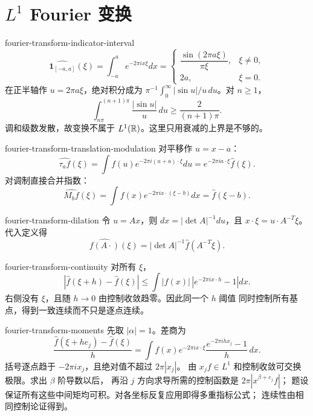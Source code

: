 \chapter{\texorpdfstring{\(L^1\)}{L1} Fourier 变换}

\begin{solution}{fourier-transform-indicator-interval}
\[
 \widehat{\mathbf1_{[-a,a]}}(\xi)
 =\int_{-a}^{a}e^{-2\pi ix\xi}dx
 =\begin{cases}\dfrac{\sin(2\pi a\xi)}{\pi\xi},&\xi\ne0,\\2a,&\xi=0.\end{cases}
\]
在正半轴作 \(u=2\pi a\xi\)，绝对积分成为
\(\pi^{-1}\int_0^\infty|\sin u|/u\,du\)。对 \(n\ge1\)，
\[
 \int_{n\pi}^{(n+1)\pi}\frac{|\sin u|}{u}\,du
 \ge\frac{2}{(n+1)\pi}.
\]
调和级数发散，故变换不属于 \(L^1(\mathbb{R})\)。这里只用衰减的上界是不够的。
\end{solution}

\begin{solution}{fourier-transform-translation-modulation}
对平移作 \(u=x-a\)：
\[
 \widehat{\tau_af}(\xi)=\int f(u)e^{-2\pi i(u+a)\cdot\xi}du
 =e^{-2\pi ia\cdot\xi}\widehat f(\xi).
\]
对调制直接合并指数：
\[
 \widehat{M_bf}(\xi)=\int f(x)e^{-2\pi ix\cdot(\xi-b)}dx
 =\widehat f(\xi-b).
\]
\end{solution}

\begin{solution}{fourier-transform-dilation}
令 \(u=Ax\)，则 \(dx=|\det A|^{-1}du\)，且
\(x\cdot\xi=u\cdot A^{-T}\xi\)。代入定义得
\[
 \widehat{f(A\cdot)}(\xi)
 =|\det A|^{-1}\widehat f(A^{-T}\xi).
\]
\end{solution}

\begin{solution}{fourier-transform-continuity}
对所有 \(\xi\)，
\[
 |\widehat f(\xi+h)-\widehat f(\xi)|
 \le\int|f(x)|\,|e^{-2\pi ix\cdot h}-1|dx.
\]
右侧没有 \(\xi\)，且随 \(h\to0\) 由控制收敛趋零。因此同一个 \(h\) 阈值
同时控制所有基点，得到一致连续而不只是逐点连续。
\end{solution}

\begin{solution}{fourier-transform-moments}
先取 \(|\alpha|=1\)。差商为
\[
 \frac{\widehat f(\xi+he_j)-\widehat f(\xi)}h
 =\int f(x)e^{-2\pi ix\cdot\xi}
   \frac{e^{-2\pi ihx_j}-1}{h}\,dx.
\]
括号逐点趋于 \(-2\pi ix_j\)，且绝对值不超过 \(2\pi|x_j|\)。
由 \(x_jf\in L^1\) 和控制收敛可交换极限。求出 \(\beta\) 阶导数以后，
再沿 \(j\) 方向求导所需的控制函数是 \(2\pi|x^{\beta+e_j}f|\)；
题设保证所有这些中间矩均可积。对各坐标反复应用即得多重指标公式；
连续性由相同控制论证得到。
\end{solution}

